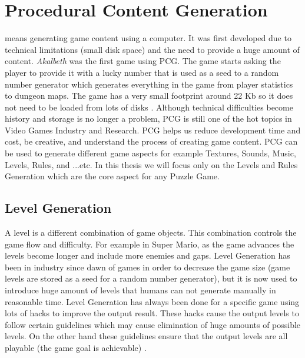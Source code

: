 \section{Procedural Content Generation}
 means generating game content using a computer. It was first developed due to technical limitations (small disk space) and the need to provide a huge amount of content. \emph{Akalbeth} was the first game using PCG. The game starts asking the player to provide it with a lucky number that is used as a seed to a random number generator which generates everything in the game from player statistics to dungeon maps. The game has a very small footprint around 22 Kb so it does not need to be loaded from lots of disks \cite{pcgFirstGame}. Although technical difficulties become history and storage is no longer a problem, PCG is still one of the hot topics in Video Games Industry and Research. PCG helps us reduce development time and cost, be creative, and understand the process of creating game content. PCG can be used to generate different game aspects for example Textures, Sounds, Music, Levels, Rules, and ...etc. In this thesis we will focus only on the Levels and Rules Generation which are the core aspect for any Puzzle Game.

\subsection{Level Generation}
A level is a different combination of game objects. This combination controls the game flow and difficulty. For example in Super Mario, as the game advances the levels become longer and include more enemies and gaps. Level Generation has been in industry since dawn of games in order to decrease the game size (game levels are stored as a seed for a random number generator), but it is now used to introduce huge amount of levels that humans can not generate manually in reasonable time. Level Generation has always been done for a specific game using lots of hacks to improve the output result. These hacks cause the output levels to follow certain guidelines which may cause elimination of huge amounts of possible levels. On the other hand these guidelines ensure that the output levels are all playable (the game goal is achievable) \cite{mcGenerateEverything}.

